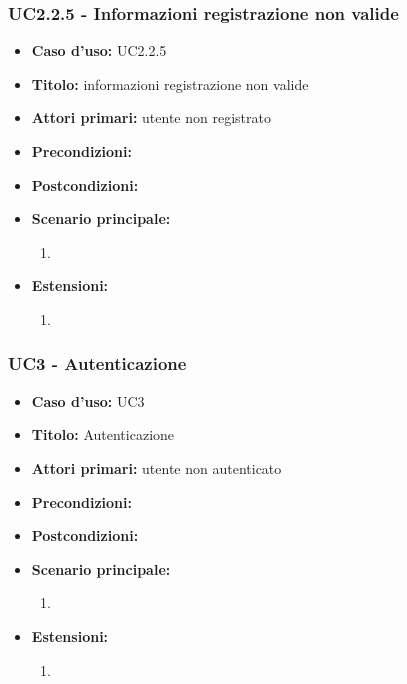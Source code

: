 \documentclass[casi-duso]{subfiles}
\begin{document}
\subsubsection{UC2.2.5 - Informazioni registrazione non valide}
\label{subsub:uc2.2.5utente}
\begin{itemize}
  \item \textbf{Caso d’uso:} UC2.2.5 
  \item \textbf{Titolo:} informazioni registrazione non valide
  \item \textbf{Attori primari:} utente non registrato
  \item \textbf{Precondizioni:} 
  \item \textbf{Postcondizioni:}  
  \item \textbf{Scenario principale:} 
  \begin{enumerate}
    \item 
  \end{enumerate}
  \item \textbf{Estensioni:} 
  \begin{enumerate}
    \item 
  \end{enumerate}     
\end{itemize}

\subsubsection{UC3 - Autenticazione}
\label{subsub:uc2utente}
\begin{itemize}
  \item \textbf{Caso d’uso:} UC3 
  \item \textbf{Titolo:} Autenticazione
  \item \textbf{Attori primari:} utente non autenticato
  \item \textbf{Precondizioni:} 
  \item \textbf{Postcondizioni:}
  \item \textbf{Scenario principale:} 
  \begin{enumerate}
    \item 
  \end{enumerate}  
  \item \textbf{Estensioni:} 
  \begin{enumerate}
    \item 
  \end{enumerate}  
\end{itemize}
\end{document}
